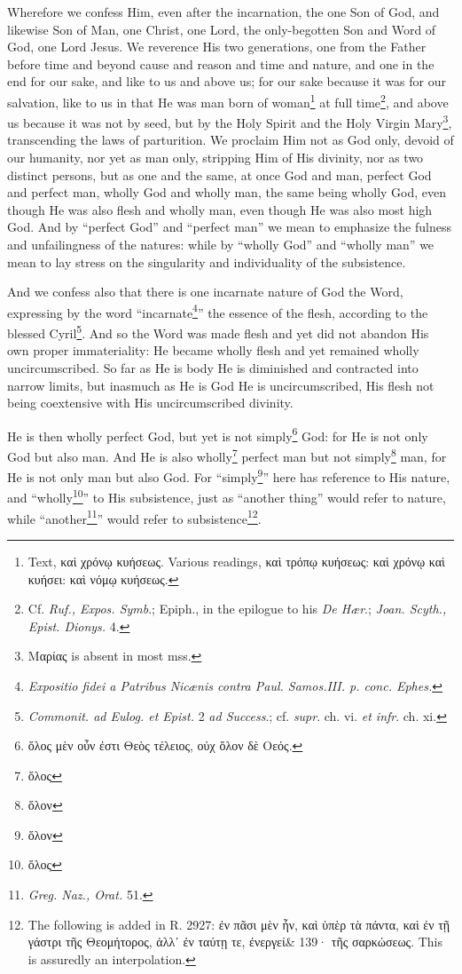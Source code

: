 Wherefore we confess Him, even after the incarnation, the one Son of God, and likewise Son of Man, one Christ, one Lord, the only-begotten Son and Word of God, one Lord Jesus. We reverence His two generations, one from the Father before time and beyond cause and reason and time and nature, and one in the end for our sake, and like to us and above us; for our sake because it was for our salvation, like to us in that He was man born of woman\footnote{Text, \textgreek{καὶ χρόνῳ κυήσεως}. Various readings, \textgreek{καὶ τρόπῳ κυήσεως: καὶ χρόνῳ καὶ κυήσει: καὶ νόμῳ κυήσεως}.} at full time\footnote{Cf. \emph{Ruf., Expos. Symb}.; Epiph., in the epilogue to his \emph{De Hær}.; \emph{Joan. Scyth., Epist. Dionys. }4.}, and above us because it was not by seed, but by the Holy Spirit and the Holy Virgin Mary\footnote{\textgreek{Μαρίας} is absent in most mss.}, transcending the laws of parturition. We proclaim Him not as God only, devoid of our humanity, nor yet as man only, stripping Him of His divinity, nor as two distinct persons, but as one and the same, at once God and man, perfect God and perfect man, wholly God and wholly man, the same being wholly God, even though He was also flesh and wholly man, even though He was also most high God. And by “perfect God” and “perfect man” we mean to emphasize the fulness and unfailingness of the natures: while by “wholly God” and “wholly man” we mean to lay stress on the singularity and individuality of the subsistence.

And we confess also that there is one incarnate nature of God the Word, expressing by the word “incarnate\footnote{\emph{Expositio fidei a Patribus Nicænis contra Paul. Samos.III. p. conc. Ephes.}}” the essence of the flesh, according to the blessed Cyril\footnote{\emph{Commonit. ad Eulog. et Epist. }2 \emph{ad Success}.; cf. \emph{supr}. ch. vi. \emph{et infr}. ch. xi.}. And so the Word was made flesh and yet did not abandon His own proper immateriality: He became wholly flesh and yet remained wholly uncircumscribed. So far as He is body He is diminished and contracted into narrow limits, but inasmuch as He is God He is uncircumscribed, His flesh not being coextensive with His uncircumscribed divinity.

He is then wholly perfect God, but yet is not simply\footnote{\textgreek{ὅλος μὲν οὖν ἐστι Θεὸς τέλειος, οὐχ ὅλον δὲ Οεός.}} God: for He is not only God but also man. And He is also wholly\footnote{\textgreek{ὅλος}} perfect man but not simply\footnote{\textgreek{ὅλον}} man, for He is not only man but also God. For “simply\footnote{\textgreek{ὅλον}}” here has reference to His nature, and “wholly\footnote{\textgreek{ὅλος}}” to His subsistence, just as “another thing” would refer to nature, while “another\footnote{\emph{Greg. Naz., Orat. }51.}” would refer to subsistence\footnote{The following is added in R. 2927: \textgreek{ἐν πᾶσι μὲν ἦν, καὶ ὑπὲρ τὰ πάντα, καὶ ἐν τῇ γάστρι τῆς Θεομήτορος, ἀλλ᾽ ἐν ταύτῃ τε, ἐνεργεί\& 139· τῆς σαρκώσεως}. This is assuredly an interpolation.}.

